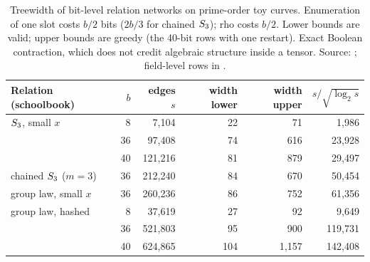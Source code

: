 \begin{table}[t]
\centering\small
\begin{tabular}{@{}lrrrrr@{}}
\toprule
Relation (schoolbook) & $b$ & edges $s$ & width lower & width upper & $s/\sqrt{\log_2s}$ \\
\midrule
$S_{3}$, small $x$ & 8 & 7{,}104 & 22 & 71 & 1{,}986 \\
 & 36 & 97{,}408 & 74 & 616 & 23{,}928 \\
 & 40 & 121{,}216 & 81 & 879 & 29{,}497 \\
chained $S_{3}$ ($m=3$) & 36 & 212{,}240 & 84 & 670 & 50{,}454 \\
group law, small $x$ & 36 & 260{,}236 & 86 & 752 & 61{,}356 \\
group law, hashed & 8 & 37{,}619 & 27 & 92 & 9{,}649 \\
 & 36 & 521{,}803 & 95 & 900 & 119{,}731 \\
 & 40 & 624{,}865 & 104 & 1{,}157 & 142{,}408 \\
\bottomrule
\end{tabular}
\caption[]{Treewidth of bit-level relation networks on prime-order toy
curves. Enumeration of one slot costs $b/2$ bits ($2b/3$ for chained
$S_{3}$); rho costs $b/2$. Lower bounds are valid; upper bounds are greedy
(the 40-bit rows with one restart). Exact Boolean contraction, which does
not credit algebraic structure inside a tensor. Source:
; field-level rows
in .}
\label{tab:pt-tw}
\end{table}

